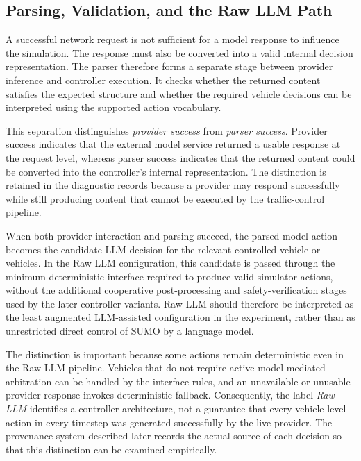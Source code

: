 \documentclass[letterpaper,10pt,conference]{ieeeconf}
\begin{document}
\subsection{Parsing, Validation, and the Raw LLM Path}



A successful network request is not sufficient for a model response to influence the simulation. The response must also be converted into a valid internal decision representation. The parser therefore forms a separate stage between provider inference and controller execution. It checks whether the returned content satisfies the expected structure and whether the required vehicle decisions can be interpreted using the supported action vocabulary.



This separation distinguishes \emph{provider success} from \emph{parser success}. Provider success indicates that the external model service returned a usable response at the request level, whereas parser success indicates that the returned content could be converted into the controller's internal representation. The distinction is retained in the diagnostic records because a provider may respond successfully while still producing content that cannot be executed by the traffic-control pipeline.



When both provider interaction and parsing succeed, the parsed model action becomes the candidate LLM decision for the relevant controlled vehicle or vehicles. In the Raw LLM configuration, this candidate is passed through the minimum deterministic interface required to produce valid simulator actions, without the additional cooperative post-processing and safety-verification stages used by the later controller variants. Raw LLM should therefore be interpreted as the least augmented LLM-assisted configuration in the experiment, rather than as unrestricted direct control of SUMO by a language model.



The distinction is important because some actions remain deterministic even in the Raw LLM pipeline. Vehicles that do not require active model-mediated arbitration can be handled by the interface rules, and an unavailable or unusable provider response invokes deterministic fallback. Consequently, the label \emph{Raw LLM} identifies a controller architecture, not a guarantee that every vehicle-level action in every timestep was generated successfully by the live provider. The provenance system described later records the actual source of each decision so that this distinction can be examined empirically.
\end{document}
